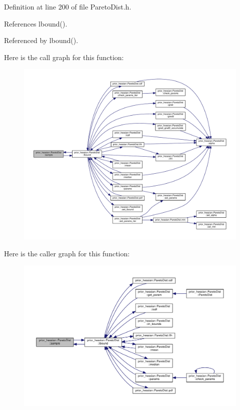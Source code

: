 Definition at line 200 of file Pareto\+Dist.\+h.



References lbound().



Referenced by lbound().



Here is the call graph for this function\+:\nopagebreak
\begin{figure}[H]
\begin{center}
\leavevmode
\includegraphics[width=350pt]{classprior__hessian_1_1ParetoDist_abe706f0786b5e8ef20b7caff07ffad0c_cgraph}
\end{center}
\end{figure}




Here is the caller graph for this function\+:\nopagebreak
\begin{figure}[H]
\begin{center}
\leavevmode
\includegraphics[width=350pt]{classprior__hessian_1_1ParetoDist_abe706f0786b5e8ef20b7caff07ffad0c_icgraph}
\end{center}
\end{figure}


